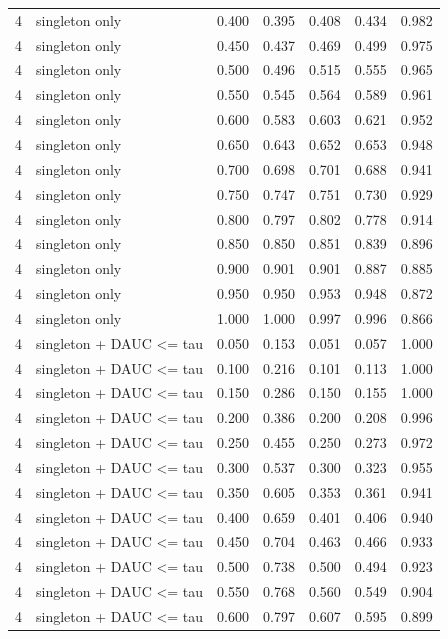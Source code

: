 \begin{tabular}{rlrrrrr}
4 & singleton only & 0.400 & 0.395 & 0.408 & 0.434 & 0.982 \\
4 & singleton only & 0.450 & 0.437 & 0.469 & 0.499 & 0.975 \\
4 & singleton only & 0.500 & 0.496 & 0.515 & 0.555 & 0.965 \\
4 & singleton only & 0.550 & 0.545 & 0.564 & 0.589 & 0.961 \\
4 & singleton only & 0.600 & 0.583 & 0.603 & 0.621 & 0.952 \\
4 & singleton only & 0.650 & 0.643 & 0.652 & 0.653 & 0.948 \\
4 & singleton only & 0.700 & 0.698 & 0.701 & 0.688 & 0.941 \\
4 & singleton only & 0.750 & 0.747 & 0.751 & 0.730 & 0.929 \\
4 & singleton only & 0.800 & 0.797 & 0.802 & 0.778 & 0.914 \\
4 & singleton only & 0.850 & 0.850 & 0.851 & 0.839 & 0.896 \\
4 & singleton only & 0.900 & 0.901 & 0.901 & 0.887 & 0.885 \\
4 & singleton only & 0.950 & 0.950 & 0.953 & 0.948 & 0.872 \\
4 & singleton only & 1.000 & 1.000 & 0.997 & 0.996 & 0.866 \\
4 & singleton + DAUC <= tau & 0.050 & 0.153 & 0.051 & 0.057 & 1.000 \\
4 & singleton + DAUC <= tau & 0.100 & 0.216 & 0.101 & 0.113 & 1.000 \\
4 & singleton + DAUC <= tau & 0.150 & 0.286 & 0.150 & 0.155 & 1.000 \\
4 & singleton + DAUC <= tau & 0.200 & 0.386 & 0.200 & 0.208 & 0.996 \\
4 & singleton + DAUC <= tau & 0.250 & 0.455 & 0.250 & 0.273 & 0.972 \\
4 & singleton + DAUC <= tau & 0.300 & 0.537 & 0.300 & 0.323 & 0.955 \\
4 & singleton + DAUC <= tau & 0.350 & 0.605 & 0.353 & 0.361 & 0.941 \\
4 & singleton + DAUC <= tau & 0.400 & 0.659 & 0.401 & 0.406 & 0.940 \\
4 & singleton + DAUC <= tau & 0.450 & 0.704 & 0.463 & 0.466 & 0.933 \\
4 & singleton + DAUC <= tau & 0.500 & 0.738 & 0.500 & 0.494 & 0.923 \\
4 & singleton + DAUC <= tau & 0.550 & 0.768 & 0.560 & 0.549 & 0.904 \\
4 & singleton + DAUC <= tau & 0.600 & 0.797 & 0.607 & 0.595 & 0.899 \\

\end{tabular}
